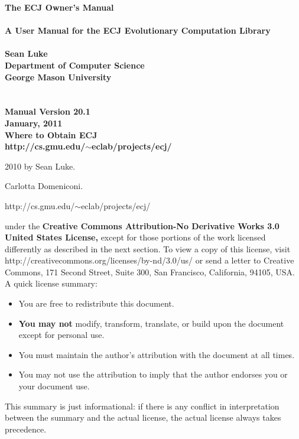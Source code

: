\documentclass[twoside,10pt]{book}
\newcommand\booktitle{The ECJ Owner's Manual}
\newcommand\reference[1]{\vspace{0.5em}\hfill{\parbox{6in}{\raggedleft\noindent\textsf{#1}}}}
\begin{document}
\noindent\huge\bf \booktitle\\
\\
{\large\rm A User Manual for the ECJ Evolutionary Computation Library}\\
\\
\Large\bf Sean Luke\\
{\large\rm 
Department of Computer Science\\
George Mason University}
\\
\\
\\
\large\rm {\bf Manual Version 20.1}\\
\large\rm January, 2011\\

\vspace{5.6in}
\noindent\Large\bf Where to Obtain ECJ\\
\large\rm http:/\!/cs.gmu.edu/\!\(\sim\)eclab/projects/ecj/

\clearpage

\small 
{}  2010 by Sean Luke.

\vspace{0.25in}
 Carlotta Domeniconi.

\vspace{0.25in}


\reference{http:/\!/cs.gmu.edu/\!\(\sim\)eclab/projects/ecj/}

\vspace{0.15in}

\vspace{0.15in}
	 under the {\bf Creative Commons Attribution-No Derivative Works 3.0 United States License,} except for those portions of the work licensed differently as described in the next section. To view a copy of this license, visit http:/\!/creativecommons.org/licenses/by-nd/3.0/us/ or send a letter to Creative Commons, 171 Second Street, Suite 300, San Francisco, California, 94105, USA.  A quick license summary:
	\begin{itemize}
	\item You are free to redistribute this document.
	\vspace{-0.5em}\item {\bf You may not} modify, transform, translate, or build upon the document except for personal use.   
	\vspace{-0.5em}\item You must maintain the author's attribution with the document at all times.
	\vspace{-0.5em}\item You may not use the attribution to imply that the author endorses you or your document use.  
	\end{itemize}
	This summary is just informational: if there is any conflict in interpretation between the summary and the actual license, the actual license always takes precedence.
\end{document}
